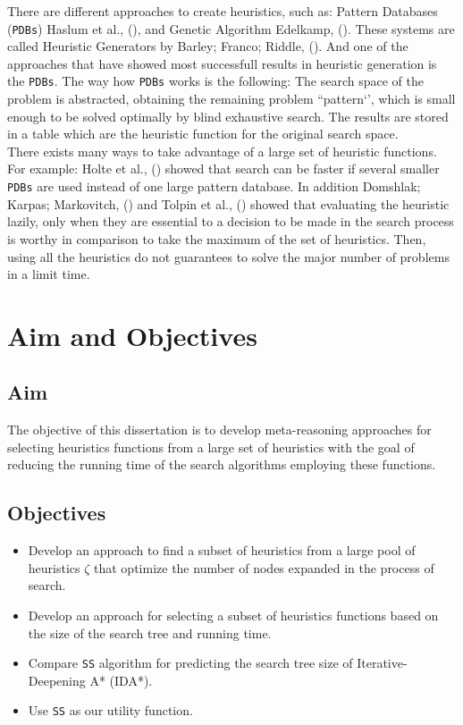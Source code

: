 There are different approaches to create heuristics, such as: Pattern Databases (\texttt{PDBs}) Haslum et al., (\citeyear{haslum2007domain}), and Genetic Algorithm Edelkamp,  (\citeyear{edelkamp2007automated}). These systems are called Heuristic Generators by Barley; Franco; Riddle, (\citeyear{BarleySantiagoOver}). And one of the approaches that have showed most successfull results in heuristic generation is the \texttt{PDBs}. The way how \texttt{PDBs} works is the following: The search space of the problem is abstracted, obtaining the remaining problem ``pattern‘’, which is small enough to be solved optimally by blind exhaustive search. The results are stored in a table which are the heuristic function for the original search space.\\

There exists many ways to take advantage of a large set of heuristic functions. For example: Holte et al., (\citeyear{holte2006maximizing}) showed that search can be faster if several smaller \texttt{PDBs} are used instead of one large pattern database. In addition Domshlak; Karpas; Markovitch, (\citeyear{domshlak2010max}) and Tolpin et al.,  (\citeyear{tolpin2013towards}) showed that evaluating the heuristic lazily, only when they are essential to a decision to be made in the search process is worthy in comparison to take the maximum of the set of heuristics. Then, using all the heuristics do not guarantees to solve the major number of problems in a limit time.
\section{Aim and Objectives}
\subsection{Aim}
\noindent
The objective of this dissertation is to develop meta-reasoning approaches for selecting heuristics functions from a large set of heuristics with the goal of reducing the running time of the search algorithms employing these functions.

\subsection{Objectives}
\noindent

\begin{itemize}
  \item Develop an approach to find a subset of heuristics from a large pool of heuristics $\zeta$ that optimize the number of nodes expanded in the process of search.
  
  \item Develop an approach for selecting a subset of heuristics functions based on the size of the search tree and running time.

  \item Compare \texttt{SS} algorithm for predicting the search tree size of Iterative-Deepening A* (IDA*).
  
  \item Use \texttt{SS} as our utility function.

\end{itemize}
